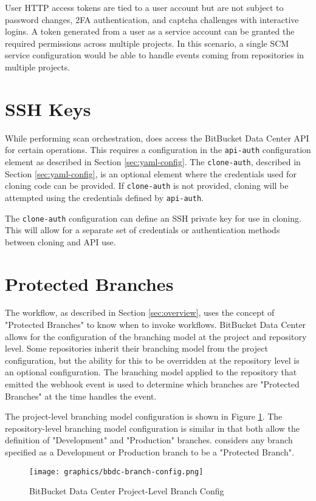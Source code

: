 User HTTP access tokens are tied to a user account but are not subject to password
changes, 2FA authentication, and captcha challenges with interactive logins.  A token generated
from a user as a service account can be granted the required permissions across multiple projects.
In this scenario, a single SCM service configuration would be able to handle events coming from
repositories in multiple projects.

\section{\cxoneflowtext\space SSH Keys}

While performing scan orchestration, \cxoneflow does access the BitBucket Data Center API for
certain operations.  This requires a configuration in the \texttt{api-auth} configuration
element as described in Section \ref{sec:yaml-config}.  The \texttt{clone-auth},
described in Section \ref{sec:yaml-config}, is an optional element where the credentials
used for cloning code can be provided.  If \texttt{clone-auth} is not provided, cloning will
be attempted using the credentials defined by \texttt{api-auth}.

The \texttt{clone-auth} configuration can define an SSH private key for use in cloning.  This
will allow for a separate set of credentials or authentication methods between cloning and
API use.


\section{Protected Branches}

The \cxoneflow workflow, as described in Section \ref{sec:overview}, uses the concept of "Protected Branches"
to know when to invoke workflows.  BitBucket Data Center allows for the configuration of the branching model
at the project and repository level.  Some repositories inherit their branching model from the project
configuration, but the ability for this to be overridden at the repository level is an optional configuration.
The branching model applied to the repository that emitted the webhook event is used to determine which branches
are "Protected Branches" at the time \cxoneflow handles the event.

\newpage

The project-level branching model configuration is shown in Figure \ref{fig:bbdc-branch-config}.  The
repository-level branching model configuration is similar in that both allow the definition of
"Development" and "Production" branches.  \cxoneflow considers any branch specified as a Development
or Production branch to be a "Protected Branch".

\begin{figure}[ht]
    \texttt{[image: graphics/bbdc-branch-config.png]}
    \caption{BitBucket Data Center Project-Level Branch Config}
    \label{fig:bbdc-branch-config}
\end{figure}

